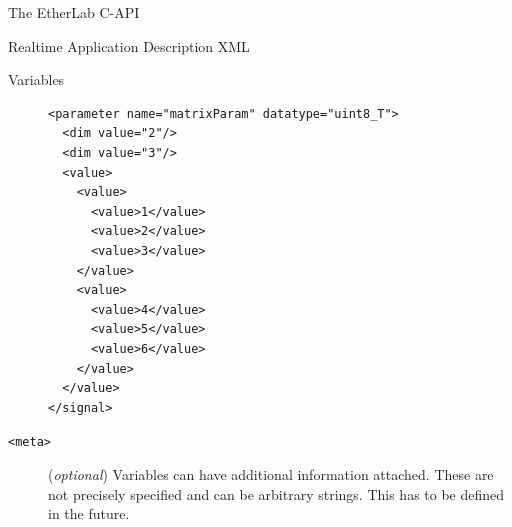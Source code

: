 \begin{ighsec}{The EtherLab C-API}
\begin{ighsec}{Realtime Application Description XML}
\begin{ighsec}{Variables}
\begin{description}
\begin{lstlisting}
<parameter name="matrixParam" datatype="uint8_T">
  <dim value="2"/>
  <dim value="3"/>
  <value>
    <value>
      <value>1</value>
      <value>2</value>
      <value>3</value>
    </value>
    <value>
      <value>4</value>
      <value>5</value>
      <value>6</value>
    </value>
  </value>
</signal>
\end{lstlisting}

\item[\small\texttt{<meta>}] (\textit{optional}) Variables can have additional
information attached. These are not precisely specified and can be arbitrary
strings. This has to be defined in the future.

\end{description}

\end{ighsec}

\end{ighsec}

\end{ighsec}


